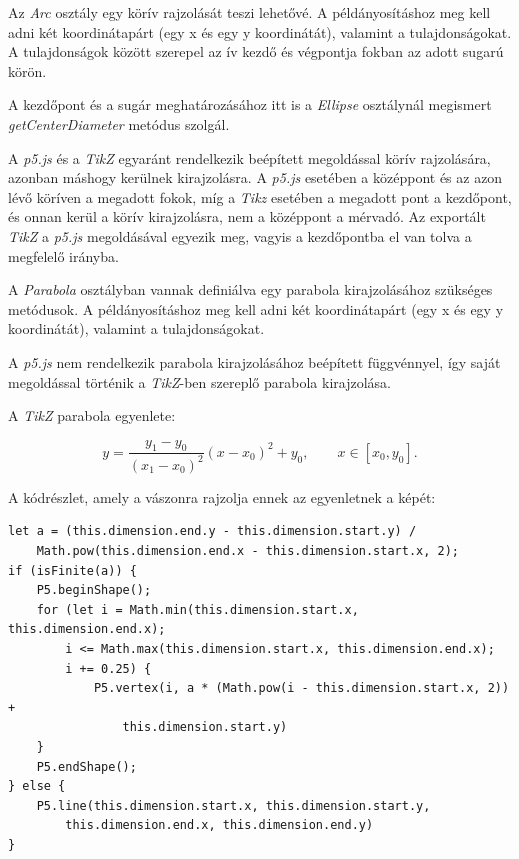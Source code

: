 
Az \textit{Arc} osztály egy körív rajzolását teszi lehetővé. A példányosításhoz meg kell adni két koordinátapárt (egy x és egy y koordinátát), valamint a tulajdonságokat. A tulajdonságok között szerepel az ív kezdő és végpontja fokban az adott sugarú körön.

A kezdőpont és a sugár meghatározásához itt is a \textit{Ellipse} osztálynál megismert \textit{getCenterDiameter} metódus szolgál. 

A \textit{p5.js} és a \textit{TikZ} egyaránt rendelkezik beépített megoldással körív rajzolására, azonban máshogy kerülnek kirajzolásra. A \textit{p5.js} esetében a középpont és az azon lévő köríven a megadott fokok, míg a \textit{Tikz} esetében a megadott pont a kezdőpont, és onnan kerül a körív kirajzolásra, nem a középpont a mérvadó. Az exportált \textit{TikZ} a \textit{p5.js} megoldásával egyezik meg, vagyis a kezdőpontba el van tolva a megfelelő irányba.


A \textit{Parabola} osztályban vannak definiálva egy parabola kirajzolásához szükséges metódusok. A példányosításhoz meg kell adni két koordinátapárt (egy x és egy y koordinátát), valamint a tulajdonságokat.

A \textit{p5.js} nem rendelkezik parabola kirajzolásához beépített függvénnyel, így saját megoldással történik a \textit{TikZ}-ben szereplő parabola kirajzolása. 

A \textit{TikZ} parabola egyenlete: 

$$\displaystyle y = \frac{y_1 - y_0}{(x_1 - x_0)^2}(x - x_0)^2 + y_0, \qquad x\in[x_0, y_0].$$

\noindent
A kódrészlet, amely a vászonra rajzolja ennek az egyenletnek a képét:

\begin{lstlisting}[style=es6, morekeywords={P5}]
let a = (this.dimension.end.y - this.dimension.start.y) / 
    Math.pow(this.dimension.end.x - this.dimension.start.x, 2);
if (isFinite(a)) {
	P5.beginShape();
	for (let i = Math.min(this.dimension.start.x, this.dimension.end.x); 
	    i <= Math.max(this.dimension.start.x, this.dimension.end.x); 
	    i += 0.25) {
		    P5.vertex(i, a * (Math.pow(i - this.dimension.start.x, 2)) +
		        this.dimension.start.y)
	}
	P5.endShape();
} else {
	P5.line(this.dimension.start.x, this.dimension.start.y, 
	    this.dimension.end.x, this.dimension.end.y)
}
\end{lstlisting}

